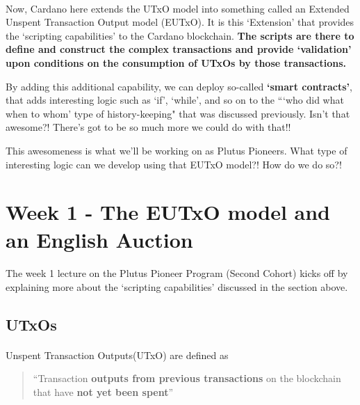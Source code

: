 \documentclass[a4paper, 11pt]{article}
\begin{document}
\begin{description}
        \paragraph{} Now, Cardano here extends the UTxO model into something called an Extended Unspent Transaction Output model (EUTxO). It is this `Extension' that provides the `scripting capabilities' to the Cardano blockchain. \textbf{The scripts are there to define and construct the complex transactions and provide `validation' upon conditions on the consumption of UTxOs by those transactions.} 
        
        By adding this additional capability, we can deploy so-called \textbf{`smart contracts'}, that adds interesting logic such as `if', `while', and so on to the ```who did what when to whom' type of history-keeping" that was discussed previously. Isn't that awesome?! There's got to be so much more we could do with that!!

        This awesomeness is what we'll be working on as Plutus Pioneers. What type of interesting logic can we develop using that EUTxO model?! How do we do so?! 
    \end{description}
    


    \vspace{20px}
    \section{Week 1 - The EUTxO model and an English Auction}

    \paragraph{} The week 1 lecture on the Plutus Pioneer Program (Second Cohort) kicks off by explaining more about the `scripting capabilities' discussed in the section above.

    \subsection{UTxOs}
    \paragraph{} Unspent Transaction Outputs(UTxO) are defined as 

    \begin{quotation}
        ``Transaction \textbf{outputs from previous transactions} on the blockchain that have \textbf{not yet been spent}''
    \end{quotation}
\end{document}
